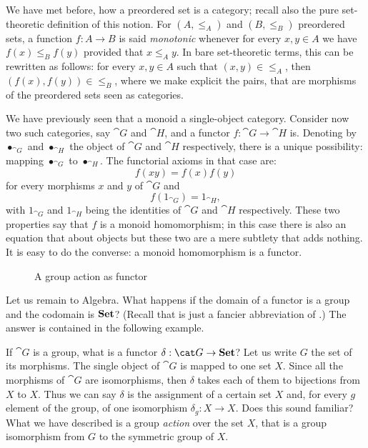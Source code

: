 \begin{example}
  We have met before, how a preordered set is a category; recall also
  the pure set-theoretic definition of this notion. For \((A, \le_A)\)
  and \((B, \le_B)\) preordered sets, a function \(f : A \to B\) is
  said {\em monotonic} whenever for every \(x, y \in A\) we have
  \(f(x) \le_B f(y)\) provided that \(x \le_A y\). In bare
  set-theoretic terms, this can be rewritten as follows: for every
  \(x, y \in A\) such that \((x, y) \in \le_A\), then
  \((f(x), f(y)) \in \le_B\), where we make explicit the pairs, that
  are morphisms of the preordered sets seen as categories.
\end{example}

\begin{example}
  We have previously seen that a monoid  a single-object
  category. Consider now two such categories, say \(\cat G\) and
  \(\cat H\), and a functor \(f : \cat G \to \cat H\) is. Denoting by
  \(\bullet_{\cat G}\) and \(\bullet_{\cat H}\) the object of
  \(\cat G\) and \(\cat H\) respectively, there is a unique
  possibility: mapping \(\bullet_{\cat G}\) to \(\bullet_{\cat
    H}\). The functorial axioms in that case are:
  \[f(xy) = f(x)f(y)\] for every morphisms \(x\) and \(y\) of
  \(\cat G\) and
  \[f(1_{\cat G}) = 1_{\cat H} ,\] with \(1_{\cat G}\) and
  \(1_{\cat H}\) being the identities of \(\cat G\) and \(\cat H\)
  respectively. These two properties say that \(f\) is a monoid
  homomorphism; in this case there is also an equation that about
  objects but these two are a mere subtlety that adds nothing. It is
  easy to do the converse: a monoid homomorphism is a functor.
\end{example}

\begin{figure}
  \centering 
  \caption{A group action as functor}
\end{figure}

Let us remain to Algebra. What happens if the domain of a functor is a
group and the codomain is \(\mathbf{Set}\)? (Recall that  is just a
fancier abbreviation of .) The answer is
contained in the following example.

\begin{example}
  If \(\cat G\) is a group, what is a functor
  \(\delta : \cat G \to \Set\)? Let us write \(G\) the set of its
  morphisms. The single object of \(\cat G\) is mapped to one set
  \(X\). Since all the morphisms of \(\cat G\) are isomorphisms, then
  \(\delta\) takes each of them to bijections from \(X\) to
  \(X\). Thus we can say \(\delta\) is the assignment of a certain set
  \(X\) and, for every \(g\) element of the group, of one isomorphism
  \(\delta_g : X \to X\). Does this sound familiar? What we have
  described is a group {\em action} over the set \(X\), that is a
  group isomorphism from \(G\) to the symmetric group of \(X\).
\end{example}

